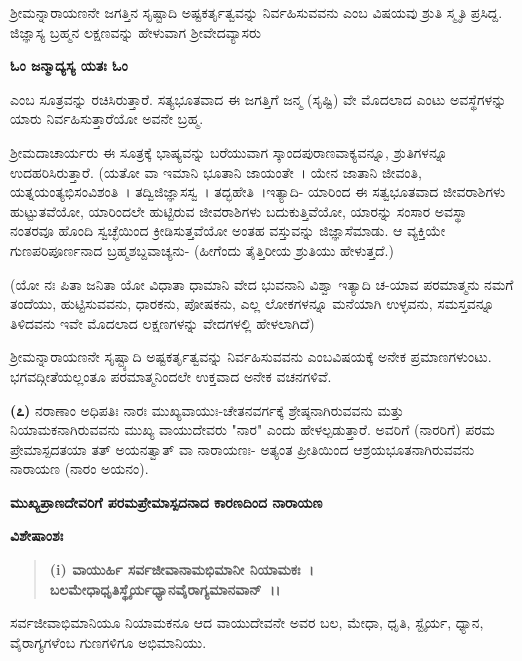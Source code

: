 ಶ‍್ರೀಮನ್ನಾರಾಯಣನೇ ಜಗತ್ತಿನ ಸೃಷ್ಟಾದಿ ಅಷ್ಟಕರ್ತೃತ್ವವನ್ನು ನಿರ್ವಹಿಸುವವನು ಎಂಬ ವಿಷಯವು ಶ್ರುತಿ ಸ್ಮೃತಿ ಪ್ರಸಿದ್ದ. ಜಿಜ್ಞಾಸ್ಯ ಬ್ರಹ್ಮನ ಲಕ್ಷಣವನ್ನು ಹೇಳುವಾಗ ಶ‍್ರೀವೇದವ್ಯಾಸರು

\begin{center}
\textbf{ಓಂ ಜನ್ಮಾದ್ಯಸ್ಯ ಯತಃ ಓಂ}
\end{center}

ಎಂಬ ಸೂತ್ರವನ್ನು ರಚಿಸಿರುತ್ತಾರೆ. ಸತ್ಯಭೂತವಾದ ಈ ಜಗತ್ತಿಗೆ ಜನ್ಮ (ಸೃಷ್ಟಿ) ವೇ ಮೊದಲಾದ ಎಂಟು ಅವಸ್ಥೆಗಳನ್ನು ಯಾರು ನಿರ್ವಹಿಸುತ್ತಾರೆಯೋ ಅವನೇ ಬ್ರಹ್ಮ.

ಶ‍್ರೀಮದಾಚಾರ್ಯರು ಈ ಸೂತ್ರಕ್ಕೆ ಭಾಷ್ಯವನ್ನು ಬರೆಯುವಾಗ ಸ್ಕಾಂದಪುರಾಣವಾಕ್ಯವನ್ನೂ, ಶ್ರುತಿಗಳನ್ನೂ ಉದಹರಿಸಿರುತ್ತಾರೆ. (ಯತೋ ವಾ ಇಮಾನಿ ಭೂತಾನಿ ಜಾಯಂತೇ~। ಯೇನ ಜಾತಾನಿ ಜೀವಂತಿ, ಯತ್ನಯಂತ್ಯಭಿಸಂವಿಶಂತಿ~। ತದ್ವಿಜಿಜ್ಞಾಸಸ್ವ~। ತದ್ಭಹೇತಿ~।\break ಇತ್ಯಾದಿ- ಯಾರಿಂದ ಈ ಸತ್ವಭೂತವಾದ ಜೀವರಾಶಿಗಳು ಹುಟ್ಟುತವೆಯೋ, ಯಾರಿಂದಲೇ ಹುಟ್ಟಿರುವ ಜೀವರಾಶಿಗಳು ಬದುಕುತ್ತಿವೆಯೋ, ಯಾರನ್ನು ಸಂಸಾರ ಅವಸ್ಥಾ ನಂತರವೂ ಹೊಂದಿ ಸ್ವಚ್ಛೆಯಿಂದ ಕ್ರೀಡಿಸುತ್ತವೆಯೋ ಅಂತಹ ವಸ್ತುವನ್ನು ಜಿಜ್ಞಾಸೆಮಾಡು. ಆ ವ್ಯಕ್ತಿಯೇ ಗುಣಪರಿಪೂರ್ಣನಾದ ಬ್ರಹ್ಮಶಬ್ದವಾಚ್ಯನು- (ಹೀಗೆಂದು ತೈತ್ತಿರೀಯ ಶ್ರುತಿಯು ಹೇಳುತ್ತದೆ.)

(ಯೋ ನಃ ಪಿತಾ ಜನಿತಾ ಯೋ ವಿಧಾತಾ ಧಾಮಾನಿ ವೇದ ಭುವನಾನಿ ವಿಶ್ವಾ ಇತ್ಯಾದಿ ಚ-ಯಾವ ಪರಮಾತ್ಮನು ನಮಗೆ ತಂದೆಯು, ಹುಟ್ಟಿಸುವವನು, ಧಾರಕನು, ಪೋಷಕನು, ಎಲ್ಲ ಲೋಕಗಳನ್ನೂ ಮನೆಯಾಗಿ ಉಳ್ಳವನು, ಸಮಸ್ತವನ್ನೂ ತಿಳಿದವನು ಇವೇ ಮೊದಲಾದ ಲಕ್ಷಣಗಳನ್ನು ವೇದಗಳಲ್ಲಿ ಹೇಳಲಾಗಿದೆ)

ಶ‍್ರೀಮನ್ನಾರಾಯಣನೇ ಸೃಷ್ಟ್ಯಾದಿ ಅಷ್ಟಕರ್ತೃತ್ವವನ್ನು ನಿರ್ವಹಿಸುವವನು ಎಂಬ\break ವಿಷಯಕ್ಕೆ ಅನೇಕ ಪ್ರಮಾಣಗಳುಂಟು. ಭಗವದ್ಗೀತೆಯಲ್ಲಂತೂ ಪರಮಾತ್ಮನಿಂದಲೇ ಉಕ್ತವಾದ ಅನೇಕ ವಚನಗಳಿವೆ.

\textbf{(೭)} ನರಾಣಾಂ ಅಧಿಪತಿಃ ನಾರಃ ಮುಖ್ಯವಾಯುಃ-ಚೇತನವರ್ಗಕ್ಕೆ ಶ್ರೇಷ್ಠನಾಗಿರುವವನು ಮತ್ತು ನಿಯಾಮಕನಾಗಿರುವವನು ಮುಖ್ಯ ವಾಯುದೇವರು "ನಾರ" ಎಂದು ಹೇಳಲ್ಪಡುತ್ತಾರೆ. ಅವರಿಗೆ (ನಾರರಿಗೆ) ಪರಮ ಪ್ರೇಮಾಸ್ಪದತಯಾ ತತ್ ಅಯನತ್ವಾತ್ ವಾ ನಾರಾಯಣಃ- ಅತ್ಯಂತ ಪ್ರೀತಿಯಿಂದ ಆಶ್ರಯಭೂತನಾಗಿರುವವನು ನಾರಾಯಣ (ನಾರಂ ಅಯನಂ).

\begin{center}
\textbf{ಮುಖ್ಯಪ್ರಾಣದೇವರಿಗೆ ಪರಮಪ್ರೇಮಾಸ್ಪದನಾದ ಕಾರಣದಿಂದ ನಾರಾಯಣ}
\end{center}

\noindent
\textbf{ವಿಶೇಷಾಂಶಃ\enginline{-}}

\begin{verse}
\textbf{(i) ವಾಯುರ್ಹಿ ಸರ್ವಜೀವಾನಾಮಭಿಮಾನೀ ನಿಯಾಮಕಃ~।}\\\textbf{ಬಲಮೇಧಾಧೃತಿಸ್ಥೈರ್ಯಧ್ಯಾನವೈರಾಗ್ಯಮಾನವಾನ್~।।}
\end{verse}


ಸರ್ವಜೀವಾಭಿಮಾನಿಯೂ ನಿಯಾಮಕನೂ ಆದ ವಾಯುದೇವನೇ ಅವರ ಬಲ, ಮೇಧಾ, ಧೃತಿ, ಸ್ಟೈರ್ಯ, ಧ್ಯಾನ, ವೈರಾಗ್ಯಗಳೆಂಬ ಗುಣಗಳಿಗೂ ಅಭಿಮಾನಿಯು.

